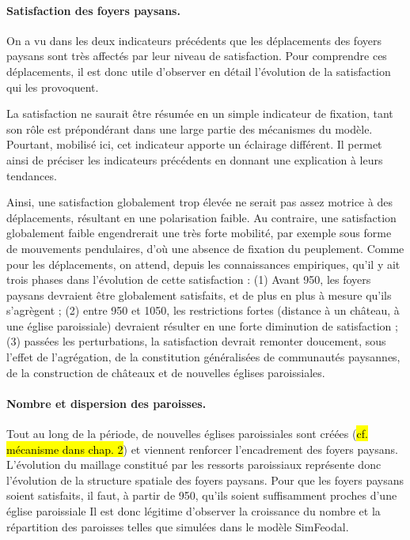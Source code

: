 \paragraph{Satisfaction des foyers paysans.}

On a vu dans les deux indicateurs précédents que les déplacements des foyers paysans sont très affectés par leur niveau de satisfaction.
Pour comprendre ces déplacements, il est donc utile d'observer en détail l'évolution de la satisfaction qui les provoquent.

La satisfaction ne saurait être résumée en un simple indicateur de fixation, tant son rôle est prépondérant dans une large partie des mécanismes du modèle.
Pourtant, mobilisé ici, cet indicateur apporte un éclairage différent.
Il permet ainsi de préciser les indicateurs précédents en donnant une explication à leurs tendances.

Ainsi, une satisfaction globalement trop élevée ne serait pas assez motrice à des déplacements, résultant en une polarisation faible.
Au contraire, une satisfaction globalement faible engendrerait une très forte mobilité, par exemple sous forme de mouvements pendulaires, d'où une absence de fixation du peuplement.
Comme pour les déplacements, on attend, depuis les connaissances empiriques, qu'il y ait trois phases dans l'évolution de cette satisfaction :
(1) Avant 950, les foyers paysans devraient être globalement satisfaits, et de plus en plus à mesure qu'ils s'agrègent ;
(2) entre 950 et 1050, les restrictions fortes (distance à un château, à une église paroissiale) devraient résulter en une forte diminution de satisfaction ;
(3) passées les perturbations, la satisfaction devrait remonter doucement, sous l'effet de l'agrégation, de la constitution généralisées de communautés paysannes, de la construction de châteaux et de nouvelles églises paroissiales.

\paragraph{Nombre et dispersion des paroisses.}

Tout au long de la période, de nouvelles églises paroissiales sont créées (\hl{cf. mécanisme dans chap. 2}) et viennent renforcer l'encadrement des foyers paysans.
L'évolution du maillage constitué par les ressorts paroissiaux représente donc l'évolution de la structure spatiale des foyers paysans.
Pour que les foyers paysans soient satisfaits, il faut, à partir de 950, qu'ils soient suffisamment proches d'une église paroissiale
Il est donc légitime d'observer la croissance du nombre et la répartition des paroisses telles que simulées dans le modèle SimFeodal.

